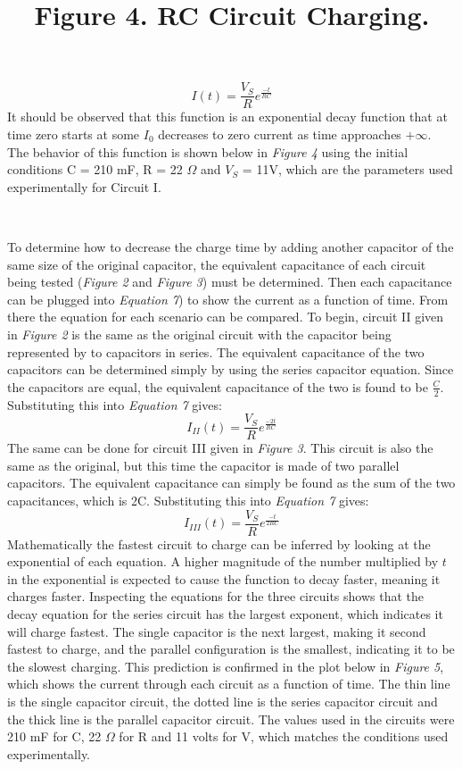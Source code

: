 \documentclass[12pt,letterpaper]{article}
\begin{document}
\begin{equation}
I(t) = \frac{V_S}{R}e^{\frac{-t}{RC}}
\end{equation}
It should be observed that this function is an exponential decay function that at time zero starts at some $I_0$ decreases to zero current as time approaches $+\infty$. The behavior of this function is shown below in \textit{Figure 4} using the initial conditions C = 210 mF, R = 22 $\Omega$ and $V_S$ = 11V, which are the parameters used experimentally for Circuit I.
\begin{center}
		\title{\textbf{Figure 4}. RC Circuit Charging.}\\
    	\resizebox{0.6\textwidth}{!}{}
\end{center}
To determine how to decrease the charge time by adding another capacitor of the same size of the original capacitor, the equivalent capacitance of each circuit being tested (\textit{Figure 2} and \textit{Figure 3}) must be determined. Then each capacitance can be plugged into \textit{Equation 7}) to show the current as a function of time. From there the equation for each scenario can be compared. To begin, circuit II given in \textit{Figure 2} is the same as the original circuit with the capacitor being represented by to capacitors in series. The equivalent capacitance of the two capacitors can be determined simply by using the series capacitor equation. Since the capacitors are equal, the equivalent capacitance of the two is found to be $\frac{C}{2}$. Substituting this into \textit{Equation 7} gives:
\begin{equation}
I_{II}(t) = \frac{V_S}{R}e^{\frac{-2t}{RC}}
\end{equation}
The same can be done for circuit III given in \textit{Figure 3}. This circuit is also the same as the original, but this time the capacitor is made of two parallel capacitors. The equivalent capacitance can simply be found as the sum of the two capacitances, which is 2C. Substituting this into \textit{Equation 7} gives:
\begin{equation}
I_{III}(t) = \frac{V_S}{R}e^{\frac{-t}{2RC}}
\end{equation}
Mathematically the fastest circuit to charge can be inferred by looking at the exponential of each equation. A higher magnitude of the number multiplied by $t$ in the exponential is expected to cause the function to decay faster, meaning it charges faster. Inspecting the equations for the three circuits shows that the decay equation for the series circuit has the largest exponent, which indicates it will charge fastest. The single capacitor is the next largest, making it second fastest to charge, and the parallel configuration is the smallest, indicating it to be the slowest charging. This prediction is confirmed in the plot below in \textit{Figure 5}, which shows the current through each circuit as a function of time. The thin line is the single capacitor circuit, the dotted line is the series capacitor circuit and the thick line is the parallel capacitor circuit. The values used in the circuits were 210 mF for C, 22 $\Omega$ for R and 11 volts for V, which matches the conditions used experimentally. 
\end{document}
